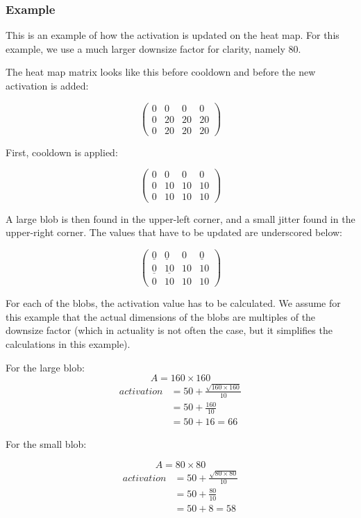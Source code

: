 \documentclass[a4paper,10pt]{article}
\begin{document}
\subsubsection{Example}\label{sec:heatmapexample}
This is an example of how the activation is updated on the heat map.
For this example, we use a much larger downsize factor for clarity,
namely $80$.

The heat map matrix looks like this before cooldown and before 
the new activation is added:

\[\left(\begin{array}{cccc}
0 & 0 & 0 & 0 \\
0 & 20 & 20 & 20 \\
0 & 20 & 20 & 20 \end{array}\right)\]

First, cooldown is applied:

\[\left(\begin{array}{cccc}
0 & 0 & 0 & 0 \\
0 & 10 & 10 & 10 \\
0 & 10 & 10 & 10 \end{array}\right)\]

A large blob is then found in the upper-left corner, and a small jitter
found in the upper-right corner. The values that have to be updated are
underscored below:

\[\left(\begin{array}{cccc}
\underline{0} & \underline{0} & 0 & \underline{0} \\
\underline{0} & \underline{10} & 10 & 10 \\
0 & 10 & 10 & 10 \end{array}\right)\]

For each of the blobs, the activation value has to be calculated.
We assume for this example that the actual dimensions of the blobs are
multiples of the downsize factor (which in actuality is not often the
case, but it simplifies the calculations in this example).

For the large blob:
\[
	A=160\times160
\]
\begin{align*}
 activation &=50 + \frac{\sqrt{160\times160}}{10} \\
  &=50 + \frac{160}{10} \\
	 &= 50 + 16 = 66
\end{align*}

For the small blob:

\[
	A=80\times80
\]
\begin{align*}
 activation &=50 + \frac{\sqrt{80\times80}}{10} \\
  &=50 + \frac{80}{10} \\
	 &= 50 + 8 = 58
\end{align*}
\end{document}
